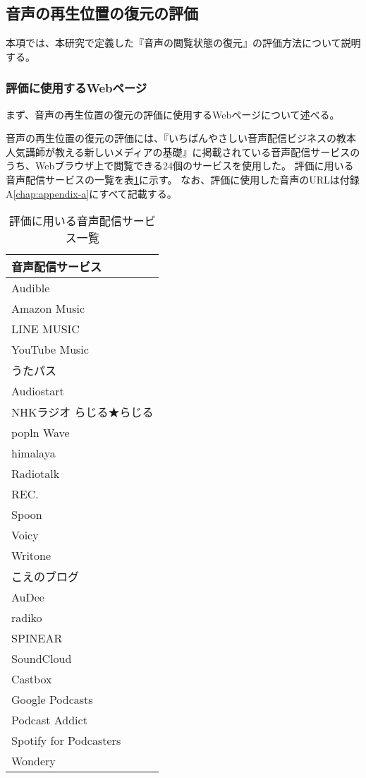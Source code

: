 \subsection{音声の再生位置の復元の評価}
本項では、本研究で定義した『音声の閲覧状態の復元』の評価方法について説明する。

\subsubsection{評価に使用するWebページ}
まず、音声の再生位置の復元の評価に使用するWebページについて述べる。

音声の再生位置の復元の評価には、『いちばんやさしい音声配信ビジネスの教本 人気講師が教える新しいメディアの基礎』\cite{}に掲載されている音声配信サービスのうち、Webブラウザ上で閲覧できる24個のサービスを使用した。
評価に用いる音声配信サービスの一覧を表\ref{tb:evl-audio-service-list}に示す。
なお、評価に使用した音声のURLは付録A\ref{chap:appendix-a}にすべて記載する。

\begin{table}[htbp]
  \label{tb:evl-audio-service-list}
  \caption{評価に用いる音声配信サービス一覧}
  \begin{center}
    \begin{tabular}{|l|}
    \hline
    音声配信サービス  \\\hline\hline
    Audible \\ \hline
    Amazon Music \\ \hline
    LINE MUSIC \\ \hline
    YouTube Music \\ \hline
    うたパス \\ \hline
    Audiostart \\ \hline
    NHKラジオ らじる★らじる \\ \hline
    popln Wave \\ \hline
    himalaya \\ \hline
    Radiotalk \\ \hline
    REC. \\ \hline
    Spoon \\ \hline
    Voicy \\ \hline
    Writone \\ \hline
    こえのブログ \\ \hline
    AuDee \\ \hline
    radiko \\ \hline
    SPINEAR \\ \hline
    SoundCloud \\ \hline
    Castbox \\ \hline
    Google Podcasts \\ \hline
    Podcast Addict \\ \hline
    Spotify for Podcasters \\ \hline
    Wondery \\ \hline
    \end{tabular}
  \end{center}
\end{table}

